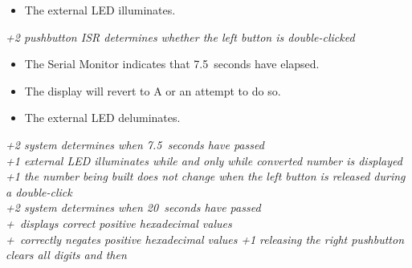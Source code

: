 \begin{enumerate}
\begin{itemize}
    \item The external LED illuminates.
    \end{itemize}
    \textit{+2 pushbutton ISR determines whether the left button is
    double-clicked} \\
    \begin{itemize}
    \item The Serial Monitor indicates that 7.5~seconds have elapsed.
    \item The display will revert to {\dviiseg A} or an attempt to do so.
    \item The external LED deluminates.
    \end{itemize}
    \textit{+2 system determines when 7.5~seconds have passed} \\
    \textit{+1 external LED illuminates while and only while converted number is
    displayed} \\
    \textit{+1 the number being built does not change when the left button is
    released during a double-click}
 \\
    \textit{+2 system determines when 20~seconds have passed}
 \\
    \textit{+\textthreequarters\ displays correct positive hexadecimal values}
 \\
    \textit{+\textonequarter\ correctly negates positive hexadecimal values}
    \textit{+1 releasing the right pushbutton clears all digits and then
}
\end{enumerate}
